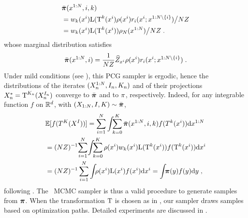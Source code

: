 \documentclass{article}
\begin{document}
\begin{align}\label{eq:def_measpi_N}
\nonumber
&  \bar{\boldsymbol{\pi}}(x^{1:N},i,k) \\
\nonumber
  &= {w_k(x^i)\mathrm{L}(\operatorname{T}^{k}(x^i) \rho(x^i) r_i(x^i;x^{1:N \setminus \{i\}})}\big/{N Z} \\
  &= {w_k(x^i)\mathrm{L}(\operatorname{T}^{k}(x^i)
  )}\rho_N(x^{1:N})\big/{N Z}
   \;.
\end{align}
whose marginal distribution satisfies
\[
\bar{\boldsymbol{\pi}}(x^{1:N},i)=\frac{1}{N Z}  \widehat{Z}_{x^i} \rho(x^i) r_i(x^i;x^{1:N \setminus \{i\}})\;.
\]
Under mild conditions (see ), this PCG sampler is ergodic, hence the distributions of the iterates $(X_n^{1:N},I_n,K_n)$ and of their projections $X^*_n=\operatorname{T}^{K_{n}}(X_n^{I_n})$ converge to $\bar{\boldsymbol{\pi}}$ and to $\pi$, respectively. Indeed, for any integrable function $f$ on $\mathbb{R}^d$, with $(X_{1:N},I,K)\sim \bar{\boldsymbol{\pi}}$,
 \begin{align*}
    & \mathbb{E}[f(T^K(X^I))]= \sum_{i=1}^N\int_{}\sum_{k=0}^K\bar{\boldsymbol{\pi}}(x^{1:N},i,k)f(T^k(x^i))
    \mathrm{d} x^{1:N}  \\
    &=(N Z)^{-1}\! \sum_{i=1}^N\!\int_{}\sum_{k=0}^K   \rho(x^i) w_k(x^i)  \mathrm{L}(\operatorname{T}^{k}(x^i))f(\operatorname{T}^k(x^i)) \mathrm{d} x^i
    \\
    & = (N Z)^{-1} \sum_{i=1}^N\int_{} \rho(x^i) \mathrm{L}(x^i)f(x^i) \mathrm{d} x^i = \int_{} \boldsymbol{\pi}(y)f(y) \mathrm{d} y \;,
\end{align*}
following .
The \IFIS\  MCMC sampler is thus a valid procedure to generate samples from $\boldsymbol{\pi}$. When the transformation $\operatorname{T}$ is chosen as in , our sampler draws samples based on optimization paths. Detailed experiments are discussed in .



\end{document}
